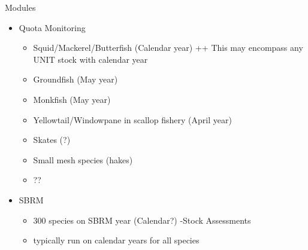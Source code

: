 \documentclass[
  ignorenonframetext,
]{beamer}
\providecommand{\tightlist}{%
  \setlength{\itemsep}{0pt}\setlength{\parskip}{0pt}}
\begin{document}
\begin{frame}{Modules}
\protect\hypertarget{modules}{}

\begin{itemize}
\tightlist
\item
  Quota Monitoring

  \begin{itemize}
  \tightlist
  \item
    Squid/Mackerel/Butterfish (Calendar year) ++ This may encompass any
    UNIT stock with calendar year
  \item
    Groundfish (May year)
  \item
    Monkfish (May year)
  \item
    Yellowtail/Windowpane in scallop fishery (April year)
  \item
    Skates (?)
  \item
    Small mesh species (hakes)
  \item
    ??
  \end{itemize}
\item
  SBRM

  \begin{itemize}
  \tightlist
  \item
    300 species on SBRM year (Calendar?) -Stock Assessments
  \item
    typically run on calendar years for all species
  \end{itemize}
\end{itemize}

\end{frame}
\end{document}
